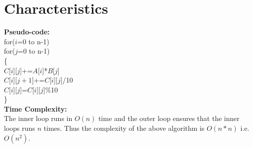 \documentclass[a4paper,11pt,oneside]{article}
\begin{document}
\section*{Characteristics}
\textbf{Pseudo-code:}\\
\hspace{10mm}
for($i$=0 to n-1) \\
\hspace{20 mm}
for($j$=0 to n-1) \\
\hspace{20 mm} \{\\
\hspace{30 mm}
$C$[$i$][$j$]+=$A$[$i$]*$B$[$j$] \\
\hspace{30 mm}
$C$[$i$][$j+1$]+=$C$[$i$][$j$]/10 \\
\hspace{30 mm}
$C$[$i$][$j$]=$C$[$i$][$j$]\%10 \\
\hspace{20 mm} \}\\
\flushleft
\textbf{Time Complexity:} \\
 The inner loop runs in $O(n)$ time and the outer loop ensures that the inner loops runs $n$ times. Thus the complexity of
 the above algorithm is $O(n*n)$ i.e. $O(n^2)$.
\end{document}
